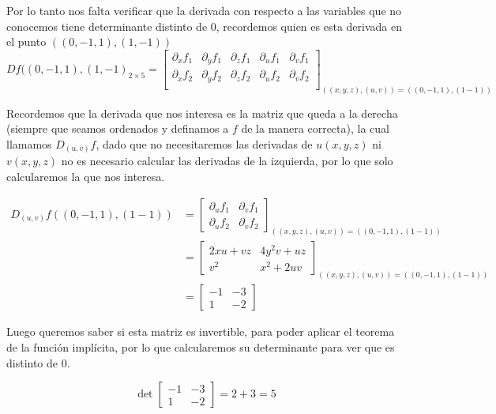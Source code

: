 \documentclass[a4paper,oneside,10.5pt]{article}
\theoremstyle{definition}
\theoremstyle{plain}
\theoremstyle{remark}
\theoremstyle{theorem}
\begin{document}
Por lo tanto nos falta verificar que la derivada con respecto a las variables que no conocemos tiene determinante distinto de $0$, recordemos quien es esta derivada en el punto $((0, -1, 1), (1, -1))$
\begin{equation*}
    Df((0, -1, 1), (1, -1)_{2 \times 5} = \left[\begin{array}{ccc|cc}
        \partial_x f_1 & \partial_y f_1 & \partial_z f_1 & \partial_u f_1 & \partial_v f_1\\
        \partial_x f_2 & \partial_y f_2 & \partial_z f_2 & \partial_u f_2 & \partial_v f_2\\
    \end{array}
    \right]_{((x, y, z), (u, v)) = ((0, -1, 1), (1 -1))}
\end{equation*}

Recordemos que la derivada que nos interesa es la matriz que queda a la derecha (siempre que seamos ordenados y definamos a $f$ de la manera correcta), la cual llamamos $D_{(u, v)}f$, dado que no necesitaremos las derivadas de $u(x, y, z)$ ni $v(x, y, z)$ no es necesario calcular las derivadas de la izquierda, por lo que solo calcularemos la que nos interesa.

\begin{align*}
    D_{(u, v)}f((0, -1, 1), (1 -1)) &= \begin{bmatrix}
        \partial_u f_1 & \partial_v f_1\\
        \partial_u f_2 & \partial_v f_2
    \end{bmatrix}_{((x, y, z), (u, v)) = ((0, -1, 1), (1 -1))}\\
    &= \begin{bmatrix}
            2xu + vz & 4y^2v + uz\\
            v^2 & x^2 + 2uv
        \end{bmatrix}_{((x, y, z), (u, v)) = ((0, -1, 1), (1 -1))}\\
    &= \begin{bmatrix}
        -1 & -3\\
        1 & -2
        \end{bmatrix}
\end{align*}

Luego queremos saber si esta matriz es invertible, para poder aplicar el teorema de la función implícita, por lo que calcularemos su determinante para ver que es distinto de $0$.

\begin{equation*}
    \det \begin{bmatrix}
        -1 & -3\\
        1 & -2
        \end{bmatrix} = 2 + 3 = 5
\end{equation*}
\end{document}
